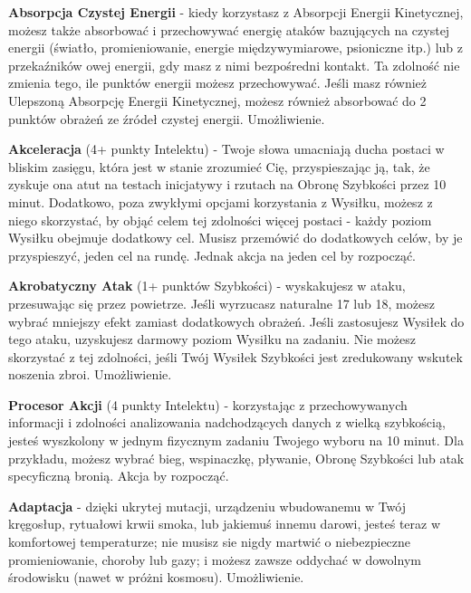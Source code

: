 \textbf{Absorpcja Czystej Energii}\label{sec:Absorpcja Czystej Energii} - kiedy korzystasz z Absorpcji Energii Kinetycznej, możesz także absorbować i przechowywać energię ataków bazujących na czystej energii (światło, promieniowanie, energie międzywymiarowe, psioniczne itp.) lub z przekaźników owej energii, gdy masz z nimi bezpośredni kontakt. Ta zdolność nie zmienia tego, ile punktów energii możesz przechowywać. Jeśli masz również Ulepszoną Absorpcję Energii Kinetycznej, możesz również absorbować do 2 punktów obrażeń ze źródeł czystej energii. Umożliwienie. 

\textbf{Akceleracja}\label{sec:Akceleracja} (4+ punkty Intelektu) - Twoje słowa umacniają ducha postaci w bliskim zasięgu, która jest w stanie zrozumieć Cię, przyspieszając ją, tak, że zyskuje ona atut na testach inicjatywy i rzutach na Obronę Szybkości przez 10 minut. Dodatkowo, poza zwykłymi opcjami korzystania z Wysiłku, możesz z niego skorzystać, by objąć celem tej zdolności więcej postaci - każdy poziom Wysiłku obejmuje dodatkowy cel. Musisz przemówić do dodatkowych celów, by je przyspieszyć, jeden cel na rundę. Jednak akcja na jeden cel by rozpocząć. 

\textbf{Akrobatyczny Atak}\label{sec:Akrobatyczny Atak} (1+ punktów Szybkości) - wyskakujesz w ataku, przesuwając się przez powietrze. Jeśli wyrzucasz naturalne 17 lub 18, możesz wybrać mniejszy efekt zamiast dodatkowych obrażeń. Jeśli zastosujesz Wysiłek do tego ataku, uzyskujesz darmowy poziom Wysiłku na zadaniu. Nie możesz skorzystać z tej zdolności, jeśli Twój Wysiłek Szybkości jest zredukowany wskutek noszenia zbroi. Umożliwienie. 

\textbf{Procesor Akcji}\label{sec:Procesor Akcji} (4 punkty Intelektu) - korzystając z przechowywanych informacji i zdolności analizowania nadchodzących danych z wielką szybkością, jesteś wyszkolony w jednym fizycznym zadaniu Twojego wyboru na 10 minut. Dla przykładu, możesz wybrać bieg, wspinaczkę, pływanie, Obronę Szybkości lub atak specyficzną bronią. Akcja by rozpocząć.

\textbf{Adaptacja}\label{sec:Adaptacja} - dzięki ukrytej mutacji, urządzeniu wbudowanemu w Twój kręgosłup, rytuałowi krwii smoka, lub jakiemuś innemu darowi, jesteś teraz w komfortowej temperaturze; nie musisz sie nigdy martwić o niebezpieczne promieniowanie, choroby lub gazy; i możesz zawsze oddychać w dowolnym środowisku (nawet w próżni kosmosu). Umożliwienie.

